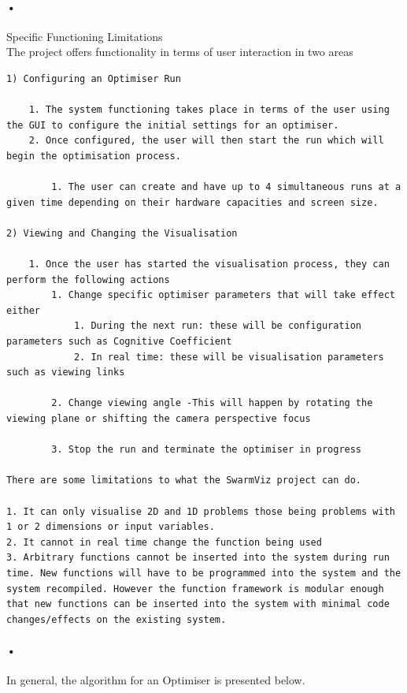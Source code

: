 \documentclass[11pt]{article}
\begin{document}
\paragraph{•}
Specific Functioning Limitations 
\\
The project offers functionality in terms of user interaction in two areas
\begin{verbatim}
1) Configuring an Optimiser Run

	1. The system functioning takes place in terms of the user using the GUI to configure the initial settings for an optimiser.
	2. Once configured, the user will then start the run which will begin the optimisation process.

		1. The user can create and have up to 4 simultaneous runs at a given time depending on their hardware capacities and screen size.

2) Viewing and Changing the Visualisation

	1. Once the user has started the visualisation process, they can perform the following actions
		1. Change specific optimiser parameters that will take effect either
			1. During the next run: these will be configuration parameters such as Cognitive Coefficient
			2. In real time: these will be visualisation parameters such as viewing links

		2. Change viewing angle -This will happen by rotating the viewing plane or shifting the camera perspective focus

		3. Stop the run and terminate the optimiser in progress

There are some limitations to what the SwarmViz project can do.

1. It can only visualise 2D and 1D problems those being problems with 1 or 2 dimensions or input variables. 
2. It cannot in real time change the function being used
3. Arbitrary functions cannot be inserted into the system during run time. New functions will have to be programmed into the system and the system recompiled. However the function framework is modular enough that new functions can be inserted into the system with minimal code changes/effects on the existing system.

\end{verbatim}

\paragraph{•}
In general, the algorithm for an Optimiser is presented below.
\end{document}
